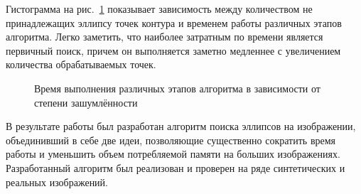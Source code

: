 Гистограмма на рис.~\ref{fig:gr1} показывает зависимость между количеством не принадлежащих эллипсу точек контура и временем работы различных этапов алгоритма.
Легко заметить, что наиболее затратным по времени является первичный поиск, причем он выполняется заметно медленнее с увеличением количества обрабатываемых точек.

\small
\begin{figure}
\caption{\label{fig:gr1}Время выполнения различных этапов алгоритма в зависимости от степени зашумлённости}
\end{figure}
\normalsize

\Conc
В результате работы был разработан алгоритм поиска эллипсов на изображении, объединивший в себе две идеи, 
позволяющие существенно сократить время работы и уменьшить объем потребляемой памяти на больших изображениях.
Разработанный алгоритм был реализован и проверен на ряде синтетических и реальных изображений. 

\printbibliography[%
    heading=bibintoc%
]


